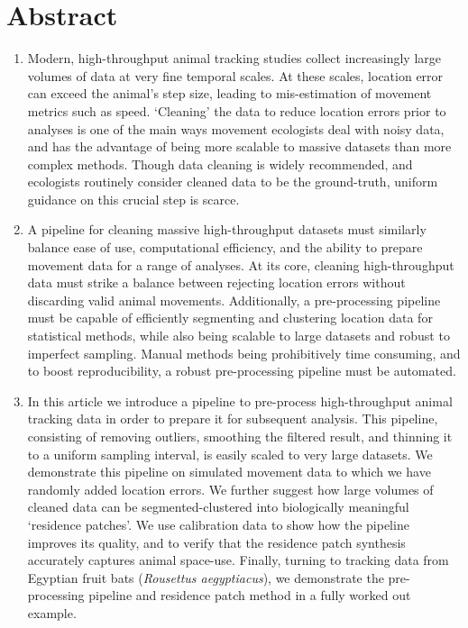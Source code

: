\documentclass[10pt,paper=a4,headings=standardclasses
]{scrartcl}
\begin{document}
\newpage

\linenumbers

\section*{Abstract} %
\noindent
\begin{enumerate}
    \item Modern, high-throughput animal tracking studies collect increasingly large volumes of data at very fine temporal scales.
    At these scales, location error can exceed the animal's step size, leading to mis-estimation of movement metrics such as speed.
    `Cleaning' the data to reduce location errors prior to analyses is one of the main ways movement ecologists deal with noisy data, and has the advantage of being more scalable to massive datasets than more complex methods.
    Though data cleaning is widely recommended, and ecologists routinely consider cleaned data to be the ground-truth, uniform guidance on this crucial step is scarce.
    
    \item A pipeline for cleaning massive high-throughput datasets must similarly balance ease of use, computational efficiency, and the ability to prepare movement data for a range of analyses.
    At its core, cleaning high-throughput data must strike a balance between rejecting location errors without discarding valid animal movements.
    Additionally, a pre-processing pipeline must be capable of efficiently segmenting and clustering location data for statistical methods, while also being scalable to large datasets and robust to imperfect sampling.
    Manual methods being prohibitively time consuming, and to boost reproducibility, a robust pre-processing pipeline must be automated.
    
    \item In this article we introduce a pipeline to pre-process high-throughput animal tracking data in order to prepare it for subsequent analysis.
    This pipeline, consisting of removing outliers, smoothing the filtered result, and thinning it to a uniform sampling interval, is easily scaled to very large datasets.
    We demonstrate this pipeline on simulated movement data to which we have randomly added location errors.
    We further suggest how large volumes of cleaned data can be segmented-clustered into biologically meaningful ‘residence patches’.
    We use calibration data to show how the pipeline improves its quality, and to verify that the residence patch synthesis accurately captures animal space-use.
    Finally, turning to tracking data from Egyptian fruit bats (\textit{Rousettus aegyptiacus}), we demonstrate the pre-processing pipeline and residence patch method in a fully worked out example.
    

\end{enumerate}
\end{document}
